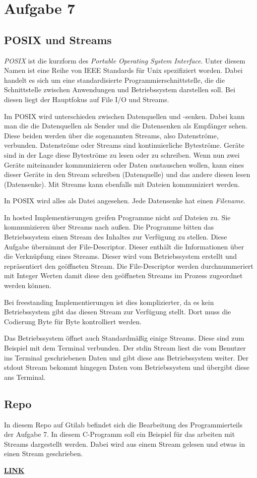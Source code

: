 \chapter{Aufgabe 7}
\section{POSIX und Streams}
\textit{POSIX} ist die kurzform des \textit{Portable Operating System Interface}.
Unter diesem Namen ist eine Reihe von IEEE Standards für Unix spezifiziert worden.
Dabei handelt es sich um eine standardisierte Programmierschnittstelle, die die Schnittstelle zwischen Anwendungen und Betriebssystem darstellen soll\cite{posix:2023}.
Bei diesen liegt der Hauptfokus auf File I/O und Streams.\par
Im POSIX wird unterschieden zwischen Datenquellen und -senken.
Dabei kann man die die Datenquellen als Sender und die Datensenken als Empfänger sehen.
Diese beiden werden über die sogenannten Streams, also Datenströme, verbunden.
Datenströme oder Streams sind kontinuierliche Byteströme.
Geräte sind in der Lage diese Byteströme zu lesen oder zu schreiben.
Wenn nun zwei Geräte miteinander kommunizieren oder Daten austauschen wollen, kann eines dieser Geräte in den Stream schreiben (Datenquelle) und das andere diesen lesen (Datensenke).
Mit Streams kann ebenfalls mit Dateien kommuniziert werden.\par
In POSIX wird alles als Datei angesehen. 
Jede Datensenke hat einen \textit{Filename}.\par
In hosted Implementierungen greifen Programme nicht auf Dateien zu.
Sie kommunizieren über Streams nach außen.
Die Programme bitten das Betriebssystem einen Stream des Inhaltes zur Verfügung zu stellen.
Diese Aufgabe übernimmt der File-Descriptor.
Dieser enthält die Informationen über die Verknüpfung eines Streams.
Dieser wird vom Betriebssystem erstellt und repräsentiert den geöffneten Stream.
Die File-Descriptor werden durchnummeriert mit Integer Werten damit diese den geöffneten Streams im Prozess zugeordnet werden können\cite{filedescriptors:2011}.\par
Bei freestanding Implementierungen ist dies komplizierter, da es kein Betriebssystem gibt das diesen Stream zur Verfügung stellt.
Dort muss die Codierung Byte für Byte kontrolliert werden.\par 
Das Betriebssystem öffnet auch Standardmäßig einige Streams.
Diese sind zum Beispiel mit dem Terminal verbunden.
Der stdin Stream liest die vom Benutzer ins Terminal geschriebenen Daten und gibt diese ans Betriebssystem weiter.
Der stdout Stream bekommt hingegen Daten vom Betriebssystem und übergibt diese ans Terminal\cite{boekelmann:2023}.


\section{Repo} 
In diesem Repo auf Gtilab befindet sich die Bearbeitung des Programmierteils der Aufgabe 7.
In diesem C-Programm soll ein Beispiel für das arbeiten mit Streams dargestellt werden.
Dabei wird aus einem Stream gelesen und etwas in einen Stream geschrieben.\par
\href{https://gitlab.thga.de/daniel.krueger/pruefung_sose_2023_aufgabe_7_streams}{\textbf{LINK}}
